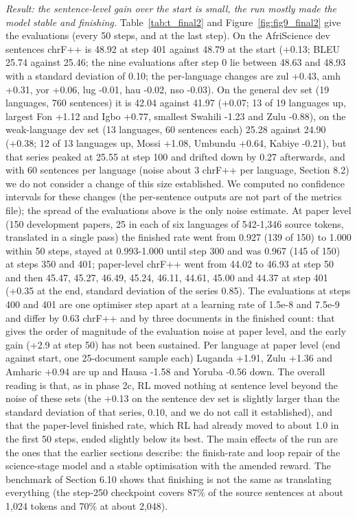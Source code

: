 \emph{Result: the sentence-level gain over the start is small, the run mostly made the model stable and finishing.} Table~\ref{tab:t_final2} and Figure~\ref{fig:fig9_final2} give the evaluations (every 50 steps, and at the last step). On the AfriScience dev sentences chrF++ is 48.92 at step 401 against 48.79 at the start (+0.13; BLEU 25.74 against 25.46; the nine evaluations after step 0 lie between 48.63 and 48.93 with a standard deviation of 0.10; the per-language changes are zul +0.43, amh +0.31, yor +0.06, lug -0.01, hau -0.02, nso -0.03). On the general dev set (19 languages, 760 sentences) it is 42.04 against 41.97 (+0.07; 13 of 19 languages up, largest Fon +1.12 and Igbo +0.77, smallest Swahili -1.23 and Zulu -0.88), on the weak-language dev set (13 languages, 60 sentences each) 25.28 against 24.90 (+0.38; 12 of 13 languages up, Mossi +1.08, Umbundu +0.64, Kabiye -0.21), but that series peaked at 25.55 at step 100 and drifted down by 0.27 afterwards, and with 60 sentences per language (noise about 3 chrF++ per language, Section 8.2) we do not consider a change of this size established. We computed no confidence intervals for these changes (the per-sentence outputs are not part of the metrics file); the spread of the evaluations above is the only noise estimate. At paper level (150 development papers, 25 in each of six languages of 542-1,346 source tokens, translated in a single pass) the finished rate went from 0.927 (139 of 150) to 1.000 within 50 steps, stayed at 0.993-1.000 until step 300 and was 0.967 (145 of 150) at steps 350 and 401; paper-level chrF++ went from 44.02 to 46.93 at step 50 and then 45.47, 45.27, 46.49, 45.24, 46.11, 44.61, 45.00 and 44.37 at step 401 (+0.35 at the end, standard deviation of the series 0.85). The evaluations at steps 400 and 401 are one optimiser step apart at a learning rate of 1.5e-8 and 7.5e-9 and differ by 0.63 chrF++ and by three documents in the finished count: that gives the order of magnitude of the evaluation noise at paper level, and the early gain (+2.9 at step 50) has not been sustained. Per language at paper level (end against start, one 25-document sample each) Luganda +1.91, Zulu +1.36 and Amharic +0.94 are up and Hausa -1.58 and Yoruba -0.56 down. The overall reading is that, as in phase 2c, RL moved nothing at sentence level beyond the noise of these sets (the +0.13 on the sentence dev set is slightly larger than the standard deviation of that series, 0.10, and we do not call it established), and that the paper-level finished rate, which RL had already moved to about 1.0 in the first 50 steps, ended slightly below its best. The main effects of the run are the ones that the earlier sections describe: the finish-rate and loop repair of the science-stage model and a stable optimisation with the amended reward. The benchmark of Section 6.10 shows that finishing is not the same as translating everything (the step-250 checkpoint covers 87\% of the source sentences at about 1,024 tokens and 70\% at about 2,048).

